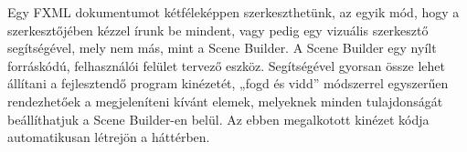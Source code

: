 Egy FXML dokumentumot kétféleképpen szerkeszthetünk, az egyik mód, hogy a szerkesztőjében kézzel írunk be mindent, vagy pedig egy vizuális szerkesztő segítségével, mely nem más, mint a Scene Builder. A Scene Builder egy nyílt forráskódú, felhasználói felület tervező eszköz. Segítségével gyorsan össze lehet állítani a fejlesztendő program kinézetét, „fogd és vidd” módszerrel egyszerűen rendezhetőek a megjeleníteni kívánt elemek, melyeknek minden tulajdonságát beállíthatjuk a Scene Builder-en belül. Az ebben megalkotott kinézet kódja automatikusan létrejön a háttérben. 